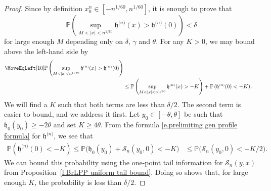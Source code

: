 \documentclass[oneside,final,11pt]{amsart}
\theoremstyle{definition}
\newcounter{assum}
\newcommand{\fh}{\mathfrak{h}}
\newcommand{\h}{\fh^{{\scriptscriptstyle(}n{\scriptscriptstyle)}}}
\newcommand{\CS}{\mathcal{S}}
\renewcommand{\S}{\CS}
\newcommand{\1}[1]{\mathbf{1}_{#1}}
\newcommand{\hlim}{\mathfrak{h}}
\renewcommand{\P}{\mathbb P}
\numberwithin{equation}{section}
\begin{document}
\begin{proof}
Since by definition $x_0^{n} \in [-n^{1/60}, n^{1/60}]$, it is enough to prove that 
%
$$\P\left(\sup_{M < |x| < n^{1/60}} \h(x) > \h(0)\right) < \delta$$
%
for large enough $M$ depending only on $\delta$, $\gamma$ and $\theta$. For any $K>0$, we may bound above the left-hand side by
%
\begin{equation}\label{e.prelimit maximizer location breakup}
\begin{split}
\MoveEqLeft[10]
\P\left(\sup_{M<|x|<n^{1/60}} \h(x) > \h(0)\right)\\
&\leq \P\left(\sup_{M<|x|<n^{1/60}} \h(x) > -K\right) + \P\left(\h(0) < -K\right).
\end{split}
\end{equation}
%
We will find a $K$ such that both terms are less than $\delta/2$. The second term is easier to bound, and we address it first. Let $y_0 \in [-\theta, \theta]$ be such that $\hlim_0(y_0) \geq -2\theta$ and set $K \geq 4\theta$. From the formula \eqref{e.prelimiting gen profile formula} for $\h$, we see that
%
\begin{align*}
\P\left(\h(0) < -K\right) \leq \P\Big(\hlim_0(y_0) + \S_n(y_0,0) < -K\Big)
%
&\leq \P\Big(\S_n(y_0, 0) < -K/2\Big).
\end{align*}
%
We can bound this probability using the one-point tail information for $\S_n(y, x)$ from Proposition~\ref{l.BrLPP uniform tail bound}. Doing so shows that, for large enough $K$, the probability is less than $\delta/2$.


\end{proof}
\end{document}

